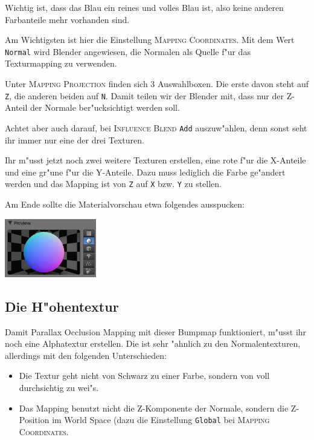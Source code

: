 \documentclass[a4paper]{article}
\newcommand{\ccaption}[1]{\textsc{#1}}
\newcommand{\cvalue}[1]{\texttt{#1}}
\newcommand{\rarrow}{\textrightarrow}
\begin{document}
Wichtig ist, dass das Blau ein reines und volles Blau ist, also keine anderen Farbanteile mehr vorhanden sind.

Am Wichtigsten ist hier die Einstellung \ccaption{Mapping \rarrow Coordinates}. Mit dem Wert \cvalue{Normal} wird Blender angewiesen, die Normalen als
Quelle f"ur das Texturmapping zu verwenden.

Unter \ccaption{Mapping \rarrow Projection} finden sich 3 Auswahlboxen. Die erste davon steht auf \cvalue{Z}, die anderen beiden auf \cvalue{N}. Damit
teilen wir der Blender mit, dass nur der Z-Anteil der Normale ber"ucksichtigt werden soll.

Achtet aber auch darauf, bei \ccaption{Influence \rarrow Blend} \cvalue{Add} auszuw"ahlen, denn sonst seht ihr immer nur eine der drei Texturen.

Ihr m"usst jetzt noch zwei weitere Texturen erstellen, eine rote f"ur die X-Anteile und eine gr"une f"ur die Y-Anteile. Dazu muss lediglich die Farbe
ge"andert werden und das Mapping ist von \cvalue{Z} auf \cvalue{X} bzw. \cvalue{Y} zu stellen.

Am Ende sollte die Materialvorschau etwa folgendes ausspucken:

\begin{center}
\includegraphics[width=40mm]{../images/blender/bumpmap-material-preview.png}
\end{center}

\subsection{Die H"ohentextur}
Damit Parallax Occlusion Mapping mit dieser Bumpmap funktioniert, m"usst ihr noch eine Alphatextur erstellen. Die ist sehr "ahnlich zu den
Normalentexturen, allerdings mit den folgenden Unterschieden:
\begin{itemize}
\item Die Textur geht nicht von Schwarz zu einer Farbe, sondern von voll durchsichtig zu wei"s.
\item Das Mapping benutzt nicht die Z-Komponente der Normale, sondern die Z-Position im World Space (dazu die Einstellung \cvalue{Global} bei
  \ccaption{Mapping \rarrow Coordinates}.
\end{itemize}
\end{document}
